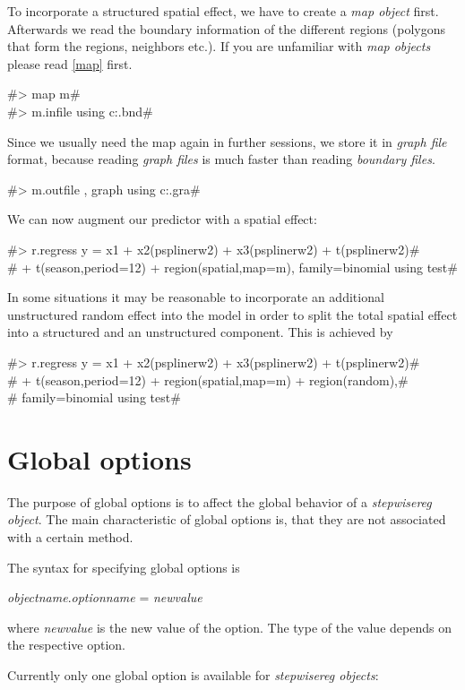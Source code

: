 To incorporate a structured spatial effect, we have to create a {\em
map object} first. Afterwards we read the boundary information of
the different regions (polygons that form the regions, neighbors
etc.). If you are unfamiliar with {\em map objects} please read
\autoref{map} first.

#> map m# \\
#> m.infile using c:\maps\map.bnd#

Since we usually need the map again in further sessions, we store
it in {\em graph file} format, because reading {\em graph files}
is much faster than reading {\em boundary files}.

#> m.outfile , graph using c:\maps\mapgraph.gra#

We can now augment our predictor with a spatial effect:

 #> r.regress y = x1 + x2(psplinerw2) + x3(psplinerw2) + t(psplinerw2)#\\
 #  + t(season,period=12) + region(spatial,map=m), family=binomial using test#

In some situations it may be reasonable to incorporate  an
additional unstructured  random effect into the model in order to
split the total spatial effect into a structured and an unstructured
component. This is achieved by

#> r.regress y = x1 + x2(psplinerw2) + x3(psplinerw2) + t(psplinerw2)#\\
#  + t(season,period=12) + region(spatial,map=m) + region(random),#\\
#  family=binomial using test#

\section{Global options}
\label{stepwiseregglobopt} 

The purpose of global options is to affect the global behavior of
a {\em stepwisereg object}. The main characteristic of global options
is, that they are not associated with a certain method.

The syntax for specifying global options is

{\em objectname}.{\em optionname} = {\em newvalue}

where {\em newvalue} is the new value of the option. The type of
the value depends on the respective option.

Currently only one global option is available for {\em stepwisereg
objects}:

